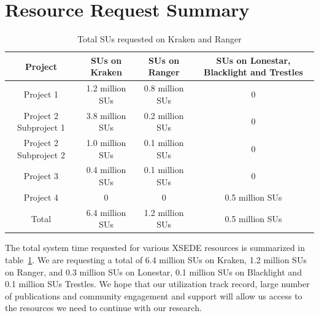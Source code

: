 \documentclass[a4paper,11pt]{article}
\newcommand{\up}{\vspace*{-1em}}
\begin{document}
\section{Resource Request Summary}

\begin{table}[!h]
\begin{center}
\begin{tabular}{|c|c|c|c| }
\hline 
Project & SUs on Kraken & SUs on Ranger  & SUs on Lonestar, Blacklight and Trestles\\ 
\hline
Project 1 & 1.2 million SUs  & 0.8 million SUs & 0 \\
\hline
Project 2 Subproject 1 & 3.8 million SUs   & 0.2 million SUs & 0 \\
\hline
Project 2 Subproject 2 & 1.0 million SUs & 0.1 million SUs & 0\\
\hline
Project 3 & 0.4 million SUs & 0.1 million SUs & 0\\
\hline
Project 4 & 0 & 0 & 0.5 million SUs\\
\hline
\hline
Total  & 6.4 million SUs & 1.2 million SUs & 0.5 million SUs\\
\hline
\end{tabular}
\end{center}
  \caption{Total SUs requested on Kraken and Ranger}\label{table:systems}
\up
\end{table}


The total system time requested for various XSEDE resources is summarized in table~\ref{table:systems}.
We are requesting a total of 6.4 million SUs on Kraken, 1.2 million SUs on Ranger, and 0.3 million SUs on Lonestar, 0.1 million SUs on Blacklight and 0.1 million SUs Trestles. We hope that our utilization track record, large number of publications and community engagement and support will allow us access to the resources we need to continue with our research.




\end{document}
